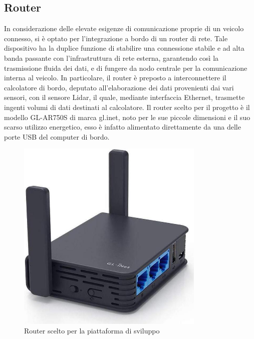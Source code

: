 \newpage
\subsection{Router}
In considerazione delle elevate esigenze di comunicazione proprie di un veicolo connesso, si è optato per l'integrazione a bordo di un router di rete. Tale dispositivo ha la duplice funzione di stabilire una connessione stabile e ad alta banda passante con l'infrastruttura di rete esterna, garantendo così la trasmissione fluida dei dati, e di fungere da nodo centrale per la comunicazione interna al veicolo. In particolare, il router è preposto a interconnettere il calcolatore di bordo, deputato all'elaborazione dei dati provenienti dai vari sensori, con il sensore Lidar, il quale, mediante interfaccia Ethernet, trasmette ingenti volumi di dati destinati al calcolatore. Il router scelto per il progetto è il modello GL-AR750S di marca gl.inet, noto per le sue piccole dimensioni e il suo scarso utilizzo energetico, esso è infatto alimentato direttamente da una delle porte USB del computer di bordo.

\begin{figure}[H]
  \centering
  \includegraphics[width=0.8\textwidth]{figures/router.jpg}
  \caption{Router scelto per la piattaforma di sviluppo}
  \label{router}
\end{figure}
